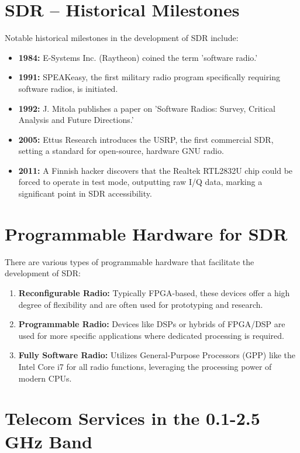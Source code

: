 \section*{SDR – Historical Milestones}

Notable historical milestones in the development of SDR include:
\begin{itemize}
    \item \textbf{1984:} E-Systems Inc. (Raytheon) coined the term 'software radio.'
    \item \textbf{1991:} SPEAKeasy, the first military radio program specifically requiring software radios, is initiated.
    \item \textbf{1992:} J. Mitola publishes a paper on 'Software Radios: Survey, Critical Analysis and Future Directions.'
    \item \textbf{2005:} Ettus Research introduces the USRP, the first commercial SDR, setting a standard for open-source, hardware GNU radio.
    \item \textbf{2011:} A Finnish hacker discovers that the Realtek RTL2832U chip could be forced to operate in test mode, outputting raw I/Q data, marking a significant point in SDR accessibility.
\end{itemize}


\section*{Programmable Hardware for SDR}

There are various types of programmable hardware that facilitate the development of SDR:
\begin{enumerate}
    \item \textbf{Reconfigurable Radio:} Typically FPGA-based, these devices offer a high degree of flexibility and are often used for prototyping and research.
    \item \textbf{Programmable Radio:} Devices like DSPs or hybrids of FPGA/DSP are used for more specific applications where dedicated processing is required.
    \item \textbf{Fully Software Radio:} Utilizes General-Purpose Processors (GPP) like the Intel Core i7 for all radio functions, leveraging the processing power of modern CPUs.
\end{enumerate}

\section*{Telecom Services in the 0.1-2.5 GHz Band}

